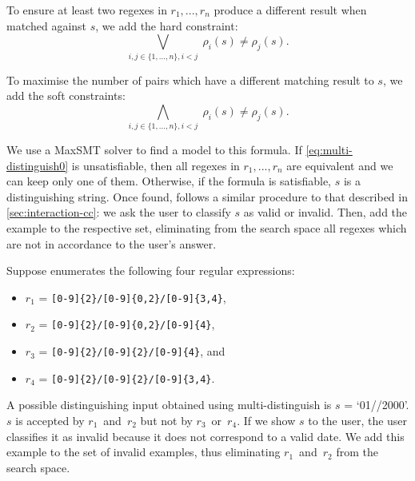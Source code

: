 To ensure at least two regexes in \(r_1, ..., r_n\) produce a different result when matched against \(s\), we add the hard constraint:
\begin{equation}\label{eq:multi-distinguish0}
    \bigvee_{i,j \in \{1, ..., n\}, i<j} \; \rho_i(s) \ne \rho_j(s).
\end{equation}

\noindent
To maximise the number of pairs which have a different matching result to \(s\), we add the soft constraints:
\begin{equation}\label{eq:multi-distinguish}
    \bigwedge_{i,j \in \{1, ..., n\}, i<j} \; \rho_i(s) \ne \rho_j(s).
\end{equation}

We use a \ac{MaxSMT} solver to find a model to this formula. If  \eqref{eq:multi-distinguish0} is unsatisfiable, then all regexes in \(r_1, ..., r_n\) are equivalent and we can keep only one of them. Otherwise, if the formula is satisfiable, \(s\) is a distinguishing string. Once found, \Forest{} follows a similar procedure to that described in \autoref{sec:interaction-cc}: we ask the user to classify \(s\) as valid or invalid. Then, \Forest{} add the example to the respective set, eliminating from the search space all regexes which are not in accordance to the user's answer. 

\begin{example}
Suppose \Forest{} enumerates the following four regular expressions:
\begin{itemize}[label={},nosep]
    \item \(r_1\) = \verb`[0-9]{2}/[0-9]{0,2}/[0-9]{3,4}`,
    \item \(r_2\) = \verb`[0-9]{2}/[0-9]{0,2}/[0-9]{4}`,
    \item \(r_3\) = \verb`[0-9]{2}/[0-9]{2}/[0-9]{4}`, and
    \item \(r_4\) = \verb`[0-9]{2}/[0-9]{2}/[0-9]{3,4}`.
\end{itemize}
%
A possible distinguishing input obtained using multi-distinguish is \(s\) = `01//2000'. \(s\) is accepted by \(r_1\)~and~\(r_2\) but not by \(r_3\)~or~\(r_4\). If we show \(s\) to the user, the user classifies it as invalid because it does not correspond to a valid date. We add this example to the set of invalid examples, thus eliminating \(r_1\)~and~\(r_2\) from the search space.
\end{example}
